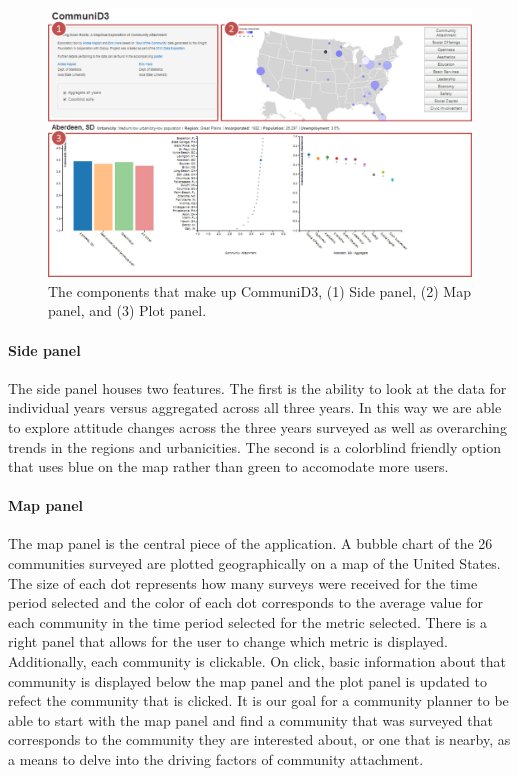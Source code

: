 \documentclass[11pt]{article}\usepackage{knitr}
\begin{document}
\begin{figure}[H]
\centering
\includegraphics[width=\textwidth]{images/tool.png}
\caption{\label{fig:tool} The components that make up CommuniD3, (1) Side panel, (2) Map panel, and (3) Plot panel.}
\end{figure}

\paragraph{Side panel} The side panel houses two features. The first is the ability to look at the data for individual years versus aggregated across all three years. In this way we are able to explore attitude changes across the three years surveyed as well as overarching trends in the regions and urbanicities. The second is a colorblind friendly option that uses blue on the map rather than green to accomodate more users.

\paragraph{Map panel} The map panel is the central piece of the application. A bubble chart of the 26 communities surveyed are plotted geographically on a map of the United States. The size of each dot represents how many surveys were received for the time period selected and the color of each dot corresponds to the average value for each community in the time period selected for the metric selected. There is a right panel that allows for the user to change which metric is displayed. Additionally, each community is clickable. On click, basic information about that community is displayed below the map panel and the plot panel is updated to refect the community that is clicked. It is our goal for a community planner to be able to start with the map panel and find a community that was surveyed that corresponds to the community they are interested about, or one that is nearby, as a means to delve into the driving factors of community attachment.
\end{document}
